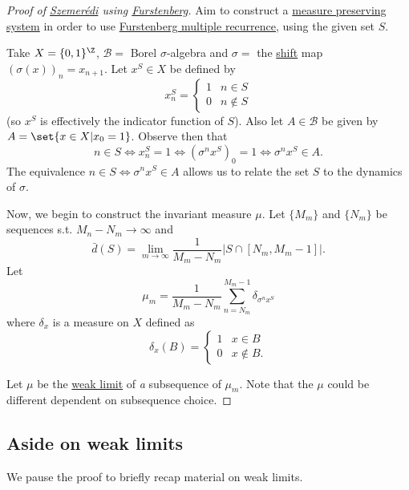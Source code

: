 \documentclass{article}
\begin{document}
\begin{proof}[Proof of \hyperlink{thm:sze}{Szemer\'edi} using \hyperlink{thm:furs}{Furstenberg}]
  Aim to construct a \hyperlink{def:mps}{measure preserving system} in order to use \hyperlink{thm:furs}{Furstenberg multiple recurrence}, using the given set $S$.

  Take $X = \{0, 1\}^\Z$, $\mathcal{B}=$ Borel $\sigma$-algebra and
  $\sigma=$ the \hyperlink{def:markovshift}{shift} map $(\sigma(x))_n = x_{n+1}$.
  Let $ {x}^S \in X$ be defined by
  \begin{equation*}
    {x}_n^S =
    \begin{cases}
      1 & n\in S\\
      0 & n \notin S
    \end{cases}
  \end{equation*}
  (so $x^S$ is effectively the indicator function of $S$).
  Also let $A\in\mathcal{B}$ be given by $A = \set{{x}\in X | x_0 = 1}$.
  Observe then that
  \begin{equation*}
    n\in S\iff x^S_n=1\iff (\sigma^n x^S)_0=1\iff \sigma^n x^S\in A.
  \end{equation*}
  The equivalence $n \in S \iff \sigma^n x^S \in A$ allows us to relate the set $S$ to the dynamics of $\sigma$.

  Now, we begin to construct the invariant measure $\mu$.
  Let $\{M_m\}$ and $\{N_m\}$ be sequences s.t. $ M_n-N_m\to\infty $ and
  \begin{equation*} \bar{d}(S) = \lim_{m\to\infty}\frac{1}{M_m-N_m}\left|S\cap[N_m,M_m-1]\right|. \end{equation*}
  Let
  \begin{equation*}
    \mu_m = \frac{1}{M_m-N_m}\sum_{n=N_m}^{M_m-1}\delta_{\sigma^n{x}^S}
  \end{equation*}
  where $\delta_x$ is a measure on $X$ defined as
  \begin{equation*}
    \delta_x(B) =
    \begin{cases}
      1 & x\in B\\
      0 & x\notin B.
    \end{cases}
  \end{equation*}

  Let $\mu$ be the \hyperlink{def:weaklimit}{weak limit} of \emph{a} subsequence of $\mu_m$.
  Note that the $\mu$ could be different dependent on subsequence choice.
  \renewcommand{\qedsymbol}{}
\end{proof}

\subsection{Aside on weak limits}
We pause the proof to briefly recap material on weak limits.
\end{document}
